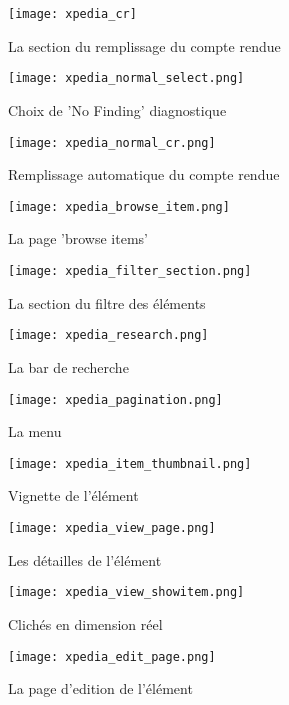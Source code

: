 \begin{figure}[H]
    \centering
    \texttt{[image: xpedia\_cr]}
    \caption{La section du remplissage du compte rendue}\label{fig:xpedia_cr}
\end{figure}
\begin{figure}[H]
    \centering
    \texttt{[image: xpedia\_normal\_select.png]}
    \caption{Choix de 'No Finding' diagnostique}\label{fig:xpedia_menu}
\end{figure}
\begin{figure}[H]
    \centering
    \texttt{[image: xpedia\_normal\_cr.png]}
    \caption{Remplissage automatique du compte rendue}\label{fig:xpedia_normal_cr}
\end{figure}
\begin{figure}[H]
    \centering
    \texttt{[image: xpedia\_browse\_item.png]}
    \caption{La page 'browse items'}\label{fig:xpedia_menu}
\end{figure}
\begin{figure}[H]
    \centering
    \texttt{[image: xpedia\_filter\_section.png]}
    \caption{La section du filtre des éléments}\label{fig:xpedia_filter_section}
\end{figure}
\begin{figure}[H]
    \centering
    \texttt{[image: xpedia\_research.png]}
    \caption{La bar de recherche}\label{fig:xpedia_research}
\end{figure}
\begin{figure}[H]
    \centering
    \texttt{[image: xpedia\_pagination.png]}
    \caption{La menu}\label{fig:xpedia_menu}
\end{figure}
\begin{figure}[H]
    \centering
    \texttt{[image: xpedia\_item\_thumbnail.png]}
    \caption{Vignette de l'élément}\label{fig:xpedia_item_thumbnail}
\end{figure}
\begin{figure}[H]
    \centering
    \texttt{[image: xpedia\_view\_page.png]}
    \caption{Les détailles de l'élément}\label{fig:xpedia_view_page}
\end{figure}
\begin{figure}[H]
    \centering
    \texttt{[image: xpedia\_view\_showitem.png]}
    \caption{Clichés en dimension réel}\label{fig:xpedia_view_showitem}
\end{figure}
\begin{figure}[H]
    \centering
    \texttt{[image: xpedia\_edit\_page.png]}
    \caption{La page d'edition de l'élément}\label{fig:xpedia_item_thumbnail}
\end{figure}
